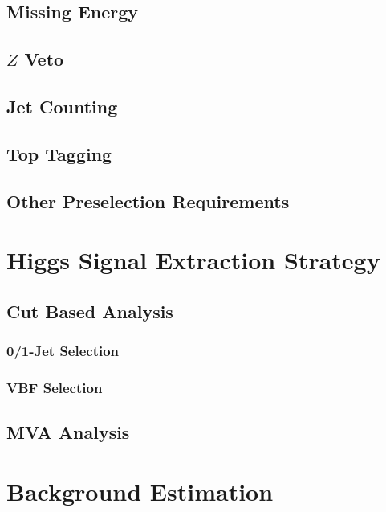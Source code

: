 \documentclass{cmspaper}
\begin{document}
   \subsection{Missing Energy} 
     \label{sec:sel_met}
%     
   \subsection{$Z$ Veto}
     \label{sec:sel_zveto}
%     
   \subsection{Jet Counting} 
     \label{sec:sel_jets}
%     
  \subsection{Top Tagging}
     \label{sec:sel_toptag}
%     
   \subsection{Other Preselection Requirements}
     \label{sec:sel_other}
%     

\section{Higgs Signal Extraction Strategy}
%   
   \label{sec:signal_selection}
   \subsection{Cut Based Analysis}
     \label{sec:anal_cutbased}
    \subsubsection{0/1-Jet Selection}
      \label{sec:sel_zerojet}
%      
     \subsubsection{VBF Selection}
       \label{sec:sel_vbf}
%       
   \subsection{MVA Analysis}
     \label{sec:anal_mva}
%     

\section{Background Estimation}
     \label{sec:backgrounds}
%     
     \label{sec:bkg_intro}
\end{document}

